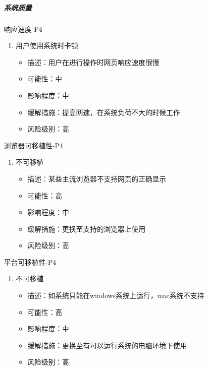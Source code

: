 \documentclass[hyperref, a4paper]{ctexart}
\providecommand{\tightlist}{%
  \setlength{\itemsep}{0pt}\setlength{\parskip}{0pt}}
\let\oldsubparagraph\subparagraph
\renewcommand{\subparagraph}[1]{\oldsubparagraph{#1}\mbox{}}
\begin{document}
\hypertarget{ux7cfbux7edfux8d28ux91cf}{%
\subparagraph{系统质量}\label{ux7cfbux7edfux8d28ux91cf}}

响应速度-P4

\begin{enumerate}
\def\labelenumi{\arabic{enumi}.}
\tightlist
\item
  用户使用系统时卡顿

  \begin{itemize}
  \tightlist
  \item
    描述：用户在进行操作时网页响应速度很慢
  \item
    可能性：中
  \item
    影响程度：中
  \item
    缓解措施：提高网速，在系统负荷不大的时候工作
  \item
    风险级别：高
  \end{itemize}
\end{enumerate}

浏览器可移植性-P4

\begin{enumerate}
\def\labelenumi{\arabic{enumi}.}
\tightlist
\item
  不可移植

  \begin{itemize}
  \tightlist
  \item
    描述：某些主流浏览器不支持网页的正确显示
  \item
    可能性：高
  \item
    影响程度：中
  \item
    缓解措施：更换至支持的浏览器上使用
  \item
    风险级别：高
  \end{itemize}
\end{enumerate}

平台可移植性-P4

\begin{enumerate}
\def\labelenumi{\arabic{enumi}.}
\tightlist
\item
  不可移植

  \begin{itemize}
  \tightlist
  \item
    描述：如系统只能在windows系统上运行，mac系统不支持
  \item
    可能性：高
  \item
    影响程度：中
  \item
    缓解措施：更换至有可以运行系统的电脑环境下使用
  \item
    风险级别：高
  \end{itemize}
\end{enumerate}
\end{document}
